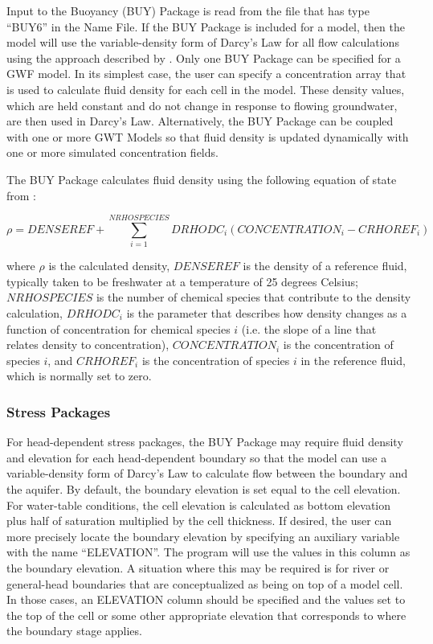 Input to the Buoyancy (BUY) Package is read from the file that has type ``BUY6'' in the Name File.  If the BUY Package is included for a model, then the model will use the variable-density form of Darcy's Law for all flow calculations using the approach described by \cite{langevin2020hydraulic}.  Only one BUY Package can be specified for a GWF model.  In its simplest case, the user can specify a concentration array that is used to calculate fluid density for each cell in the model.  These density values, which are held constant and do not change in response to flowing groundwater, are then used in Darcy's Law.  Alternatively, the BUY Package can be coupled with one or more GWT Models so that fluid density is updated dynamically with one or more simulated concentration fields.

The BUY Package calculates fluid density using the following equation of state from \cite{langevin2008seawat}:

\begin{equation}
\label{eqn:volumeconservationdiscrete}
\rho = DENSEREF + \sum_{i=1}^{NRHOSPECIES} DRHODC_i \left ( CONCENTRATION_i - CRHOREF_i \right )
\end{equation}

\noindent where $\rho$ is the calculated density, $DENSEREF$ is the density of a reference fluid, typically taken to be freshwater at a temperature of 25 degrees Celsius; $NRHOSPECIES$ is the number of chemical species that contribute to the density calculation, $DRHODC_i$ is the parameter that describes how density changes as a function of concentration for chemical species $i$ (i.e. the slope of a line that relates density to concentration), $CONCENTRATION_i$ is the concentration of species $i$, and $CRHOREF_i$ is the concentration of species $i$ in the reference fluid, which is normally set to zero.

\subsubsection{Stress Packages}
For head-dependent stress packages, the BUY Package may require fluid density and elevation for each head-dependent boundary so that the model can use a variable-density form of Darcy's Law to calculate flow between the boundary and the aquifer.  By default, the boundary elevation is set equal to the cell elevation.  For water-table conditions, the cell elevation is calculated as bottom elevation plus half of saturation multiplied by the cell thickness.  If desired, the user can more precisely locate the boundary elevation by specifying an auxiliary variable with the name ``ELEVATION''.  The program will use the values in this column as the boundary elevation.  A situation where this may be required is for river or general-head boundaries that are conceptualized as being on top of a model cell.  In those cases, an ELEVATION column should be specified and the values set to the top of the cell or some other appropriate elevation that corresponds to where the boundary stage applies.

